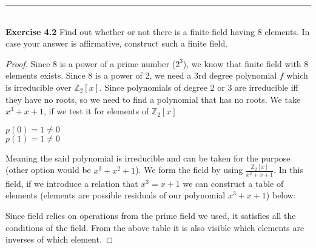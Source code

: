 \documentclass[a4paper]{article}
\begin{document}
\noindent\rule{12cm}{0.4pt}\\
\noindent \textbf{Exercise 4.2} Find out whether or not there is a finite field having 8 elements. In case your answer is affirmative, construct such a finite field.
\begin{proof}
Since 8 is a power of a prime number ($2^3$), we know that finite field with 8 elements exists. Since 8 is a power of 2, we need a 3rd degree polynomial $f$ which is irreducible over $\mathbb{Z}_{2}[x]$. Since polynomials of degree 2 or 3 are irreducible iff they have no roots, so we need to find a polynomial that has no roots. We take $x^3 + x + 1$, if we test it for elements of $\mathbb{Z}_{2}[x]$
\begin{center}
$p(0) = 1 \neq 0$\\
$p(1) = 1 \neq 0$	
\end{center}
Meaning the said polynomial is irreducible and can be taken for the purpose (other option would be $x^3 + x^2 + 1$). We form the field by using $\frac{\mathbb{Z}_{2}[x]}{x^3 + x + 1}$. In this field, if we introduce a relation that $x^3 = x + 1$ we can construct a table of elements (elements are possible residuals of our polynomial $x^3 + x + 1$) below:
\begin{center}
\centering
{}
\end{center}
Since field relies on operations from the prime field we used, it satisfies all the conditions of the field. From the above table it is also visible which elements are inverses of which element.
\end{proof}
\end{document}
